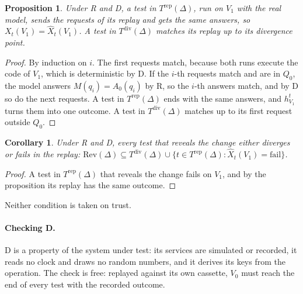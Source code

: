 \documentclass[11pt,a4paper]{article}
\newtheorem{proposition}{Proposition}
\newtheorem{corollary}{Corollary}
\newcommand{\Trep}{T^{\mathrm{rep}}(\Delta)}
\newcommand{\Tdiv}{T^{\mathrm{div}}(\Delta)}
\begin{document}
\begin{proposition}
\label{prop:replay}
Under R and D, a test in $\Trep$, run on $V_1$ with the real model, sends the requests of its replay and gets the
same answers, so $X_t(V_1) = \hat{X}_t(V_1)$. A test in $\Tdiv$ matches its replay up to its divergence point.
\end{proposition}

\begin{proof}
By induction on $i$. The first requests match, because both runs execute the code of $V_1$, which is
deterministic by D. If the $i$-th requests match and are in $Q_0$, the model answers $M(q_i) = A_0(q_i)$ by R, so
the $i$-th answers match, and by D so do the next requests. A test in $\Trep$ ends with the same answers, and
$h^t_{V_1}$ turns them into one outcome. A test in $\Tdiv$ matches up to its first request outside $Q_0$.
\end{proof}

\begin{corollary}
\label{cor:safe}
Under R and D, every test that reveals the change either diverges or fails in the replay:
$\mathrm{Rev}(\Delta) \subseteq \Tdiv \cup \{t \in \Trep : \hat{X}_t(V_1) = \text{fail}\}$.
\end{corollary}

\begin{proof}
A test in $\Trep$ that reveals the change fails on $V_1$, and by the proposition its replay has the same outcome.
\end{proof}

Neither condition is taken on trust.

\paragraph{Checking D.} D is a property of the system under test: its services are simulated or recorded, it reads
no clock and draws no random numbers, and it derives its keys from the operation. The check is free: replayed
against its own cassette, $V_0$ must reach the end of every test with the recorded outcome.
\end{document}
